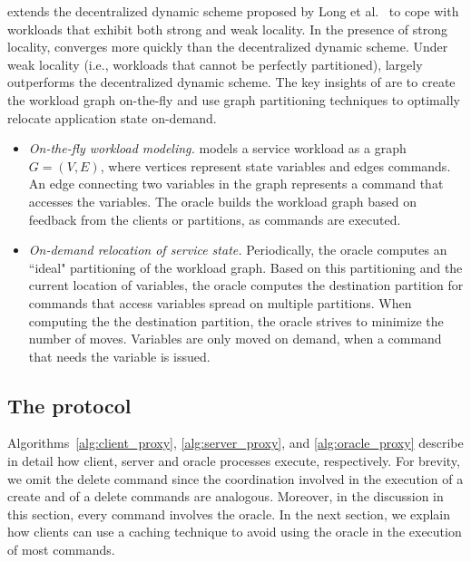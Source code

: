 \dynastar extends the decentralized dynamic scheme proposed by Long et al.~\cite{hoang2016} to cope with workloads that exhibit both strong and weak locality.
In the presence of strong locality, \dynastar converges more quickly than the decentralized dynamic scheme.
Under weak locality (i.e., workloads that cannot be perfectly partitioned), \dynastar largely outperforms the decentralized dynamic scheme.
The key insights of \dynastar are to create the workload graph on-the-fly and use graph partitioning techniques to optimally relocate application state on-demand.
\begin{itemize}
\item \emph{On-the-fly workload modeling.}
\dynastar models a service workload as a graph $G = (V, E)$, where vertices represent state variables and edges commands.
An edge connecting two variables in the graph represents a command that accesses the variables. 
The oracle builds the workload graph based on feedback from the clients or partitions, as commands are executed.
\item \emph{On-demand relocation of service state.}
Periodically, the oracle computes an ``ideal" partitioning of the workload graph.
Based on this partitioning and the current location of variables, the oracle computes the destination partition for commands that access variables spread on multiple partitions.
When computing the the destination partition, the oracle strives to minimize the number of moves. 
Variables are only moved on demand, when a command that needs the variable is issued.
\end{itemize}




\subsection{The \dynastar protocol}

Algorithms~\ref{alg:client_proxy}, \ref{alg:server_proxy}, and \ref{alg:oracle_proxy} describe in detail how client, server and oracle processes execute, respectively.
For brevity, we omit the delete command since the coordination involved in the execution of a create and of a delete commands are analogous. 
Moreover, in the discussion in this section, every command involves the oracle.
In the next section, we explain how clients can use a caching technique to avoid using the oracle in the execution of most commands.

